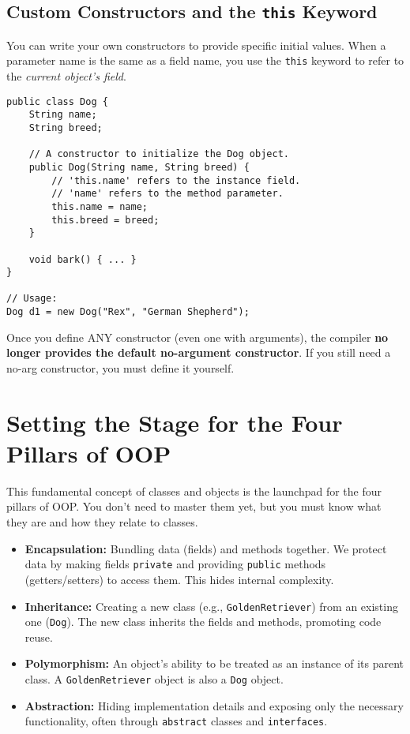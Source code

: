 \documentclass[12pt]{article}
\begin{document}
\begin{enumerate}[label=(\arabic*)]
\subsection*{Custom Constructors and the \texttt{this} Keyword}
You can write your own constructors to provide specific initial values. When a parameter name is the same as a field name, you use the \texttt{this} keyword to refer to the \textit{current object's field}.
\begin{verbatim}
public class Dog {
    String name;
    String breed;

    // A constructor to initialize the Dog object.
    public Dog(String name, String breed) {
        // 'this.name' refers to the instance field.
        // 'name' refers to the method parameter.
        this.name = name;
        this.breed = breed;
    }

    void bark() { ... }
}

// Usage:
Dog d1 = new Dog("Rex", "German Shepherd");
\end{verbatim}
Once you define ANY constructor (even one with arguments), the compiler \textbf{no longer provides the default no-argument constructor}. If you still need a no-arg constructor, you must define it yourself.

\section{Setting the Stage for the Four Pillars of OOP}
This fundamental concept of classes and objects is the launchpad for the four pillars of OOP. You don't need to master them yet, but you must know what they are and how they relate to classes.
\begin{itemize}
    \item \textbf{Encapsulation:} Bundling data (fields) and methods together. We protect data by making fields \texttt{private} and providing \texttt{public} methods (getters/setters) to access them. This hides internal complexity.
    \item \textbf{Inheritance:} Creating a new class (e.g., \texttt{GoldenRetriever}) from an existing one (\texttt{Dog}). The new class inherits the fields and methods, promoting code reuse.
    \item \textbf{Polymorphism:} An object's ability to be treated as an instance of its parent class. A \texttt{GoldenRetriever} object is also a \texttt{Dog} object.
    \item \textbf{Abstraction:} Hiding implementation details and exposing only the necessary functionality, often through \texttt{abstract} classes and \texttt{interfaces}.
\end{itemize}


\end{enumerate}
\end{document}
